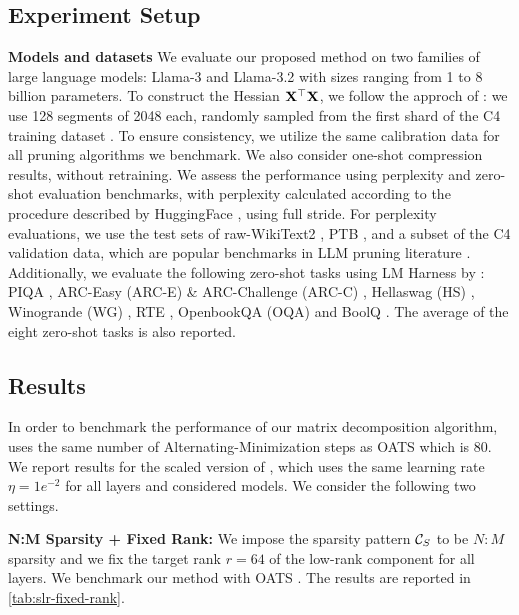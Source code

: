 
\subsection{Experiment Setup}
\vspace{-3pt}
\textbf{Models and datasets} We evaluate our proposed method \ourframework on two families of large language models: Llama-3 and Llama-3.2 \cite{dubey2024llama} with sizes ranging from 1 to 8 billion parameters. 
To construct the Hessian $\mathbf{X}^\top\mathbf{X}$, we follow the approch of \citet{frantar2023sparsegpt}: we use 128 segments of 2048 each, randomly sampled from the first shard of the C4 training dataset \cite{JMLR:v21:20-074}. To ensure consistency, we utilize the same calibration data for all pruning algorithms we benchmark. We also consider one-shot compression results, without retraining. 
We assess the performance using perplexity and zero-shot evaluation benchmarks, with perplexity calculated according to the procedure described by HuggingFace \cite{Perplexity}, using full stride. For perplexity evaluations, we use the test sets of raw-WikiText2 \cite{merity2017pointer}, PTB \cite{Marcus1994}, and a subset of the C4 validation data, which are popular benchmarks in LLM pruning literature \cite{frantar2023sparsegpt,meng2024alps,meng2024osscar}. Additionally, we evaluate the following zero-shot tasks using LM Harness by \citet{gao10256836framework}: PIQA \cite{bisk2020piqa}, ARC-Easy (ARC-E) \& ARC-Challenge (ARC-C) \cite{clark2018think}, Hellaswag (HS) \cite{zellers2019hellaswag}, Winogrande (WG) \cite{sakaguchi2021winogrande}, RTE \cite{poliak2020survey}, OpenbookQA (OQA) \cite{banerjee2019careful} and BoolQ \cite{clark2019boolq}. The average of the eight zero-shot tasks is also reported.

\vspace{-5pt}
\subsection{Results}
\vspace{-10pt}
In order to benchmark the performance of our matrix decomposition algorithm, \ourframework uses the same number of Alternating-Minimization steps as OATS \cite{zhang2024oats} which is $80$. We report results for the scaled version of \ourframework, which uses the same learning rate $\eta = 1e^{-2}$ for all layers and considered models. We consider the following two settings.

\textbf{N:M Sparsity + Fixed Rank:}
We impose the sparsity pattern $\mathcal{C}_S$ to be $N:M$ sparsity and we fix the target rank $r = 64$ of the low-rank component for all layers. We benchmark our method with OATS \cite{zhang2024oats}. The results are reported in \cref{tab:slr-fixed-rank}.

